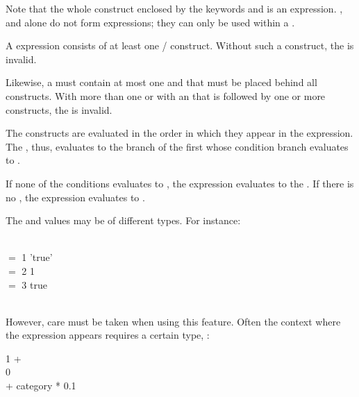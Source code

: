 Note that the whole construct enclosed by
the keywords  and 
is an expression. , 
and  alone do not form expressions;
they can only be used within a .

A  expression consists of at least
one / construct.
Without such a construct, the 
is invalid.

Likewise, a  must contain at most
one 
and that 
must be placed behind all  constructs.
With more than one 
or with an  that is followed
by one or more  constructs,
the  is invalid.

The  constructs are evaluated
in the order in which they appear in the  expression.
The , thus, evaluates
to the  branch of the first 
whose condition branch evaluates to .

If none of the  conditions evaluates to ,
the  expression evaluates
to the  .
If there is no ,
the  expression
evaluates to .

The  and  values
may be of different types.
For instance:

\begin{minipage}{\textwidth}
\\
\hspace*{1cm}  $=$ 1
 'true' \\
\hspace*{1cm}  $=$ 2
 1 \\
\hspace*{1cm}  $=$ 3
 true \\
\hspace*{1cm}  \\
\end{minipage}

However, care must be taken when using this feature.
Often the context where the  expression
appears requires a certain type, \eg: 

\begin{minipage}{\textwidth}
 1 +
\\
\hspace*{2.5cm}  
 0 \\
\hspace*{2.5cm}  + category * 0.1 \\
\hspace*{2cm}
\end{minipage}

